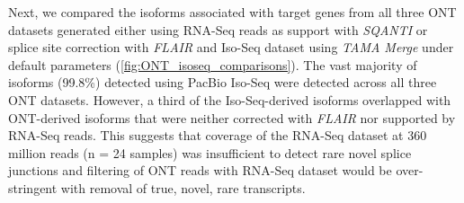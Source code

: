 Next, we compared the isoforms associated with target genes from all three ONT datasets generated either using RNA-Seq reads as support with \textit{SQANTI} or splice site correction with \textit{FLAIR} and Iso-Seq dataset using \textit{TAMA Merge} under default parameters (\cref{fig:ONT_isoseq_comparisons}). The vast majority of isoforms (99.8\%) detected using PacBio Iso-Seq were detected across all three ONT datasets. However, a third of the Iso-Seq-derived isoforms overlapped with ONT-derived isoforms that were neither corrected with \textit{FLAIR} nor supported by RNA-Seq reads. This suggests that coverage of the RNA-Seq dataset at 360 million reads (n = 24 samples) was insufficient to detect rare novel splice junctions and filtering of ONT reads with RNA-Seq dataset would be over-stringent with removal of true, novel, rare transcripts. %

